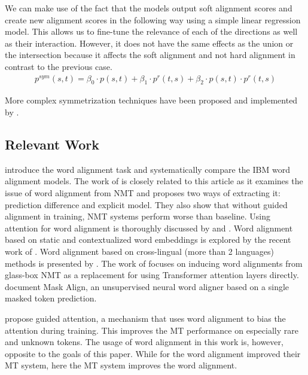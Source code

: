 We can make use of the fact that the models output soft alignment scores and create new alignment scores in the following way using a simple linear regression model. This allows us to fine-tune the relevance of each of the directions as well as their interaction. However, it does not have the same effects as the union or the intersection because it affects the soft alignment and not hard alignment in contrast to the previous case.
\begin{gather*}
    p^{sym}(s,t) = \beta_0 \cdot p(s, t) + \beta_1 \cdot p^r(t, s) + \beta_2 \cdot p(s, t) \cdot p^r(t, s)
\end{gather*}

More complex symmetrization techniques have been proposed and implemented by \citet{och2000improved, junczys2011symgiza++}.

\subsection{Relevant Work}

\citet{och2003systematic} introduce the word alignment task and systematically compare the IBM word alignment models.
The work of \citet{li2019word} is closely related to this article as it examines the issue of word alignment from NMT and proposes two ways of extracting it: prediction difference and explicit model. They also show that without guided alignment in training, NMT systems perform worse than \fastalign{} baseline.
Using attention for word alignment is thoroughly discussed by \citet{bahdanau2014neural} and \citet{zenkel2019adding}.
Word alignment based on static and contextualized word embeddings is explored by the recent work of \citet{sabet2020simalign}.
Word alignment based on cross-lingual (more than 2 languages) methods is presented by \citet{wu2021slua}.
The work of \citet{chen2020accurate} focuses on inducing word alignments from glass-box NMT as a replacement for using Transformer attention layers directly.
\citet{chen2020mask} document Mask Align, an unsupervised neural word aligner based on a single masked token prediction.

\citet{chen2016guided} propose guided attention, a mechanism that uses word alignment to bias the attention during training. This improves the MT performance on especially rare and unknown tokens. The usage of word alignment in this work is, however, opposite to the goals of this paper. While for \citet{chen2016guided} the word alignment improved their MT system, here the MT system improves the word alignment.


